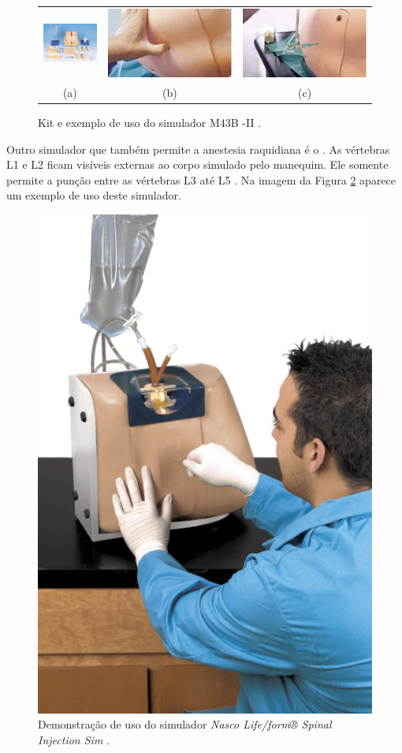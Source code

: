 \begin{figure}[ht!]
    \centering
        \begin{tabular}{ccc}
        \includegraphics[width=0.3\linewidth]{capitulos/figuras/m43b-kit.jpg} & 
        \includegraphics[width=0.3\linewidth]{capitulos/figuras/m43b-usoPalpacao.jpg} 
        &
        \includegraphics[width=0.3\linewidth]{capitulos/figuras/m43b-usoAgulha.jpg} 
        \\
        (a) & (b) & (c)
        \end{tabular}
    \caption{Kit e exemplo de uso do simulador M43B -II \cite{KyotokagakuCo.2011}.}
    \label{fig:m43bSimulator}
\end{figure}

Outro simulador que também permite a anestesia raquidiana é o . As vértebras L1 e L2 ficam visíveis externas ao corpo simulado pelo manequim. Ele somente permite a punção entre as vértebras L3 até L5 \cite{Nasco2008}. Na imagem da Figura \ref{fig:nascoSimulator} aparece um exemplo de uso deste simulador.

\begin{figure}[ht!]
    \centering
    \includegraphics[width=0.3\linewidth]{capitulos/figuras/nascoSimulator.png} 
    \caption{Demonstração de uso do simulador \textit{Nasco Life/form® Spinal Injection Sim} \cite{Nasco2008}.}
    \label{fig:nascoSimulator}
\end{figure}

